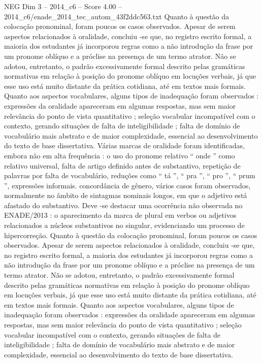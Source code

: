 \begin{textsample}{NEG Dim 3 – 2014\_c6 – Score 4.00 – 2014\_c6/enade\_2014\_tec\_autom\_43f2ddc563.txt}
Quanto à questão da colocação pronominal, foram poucos os casos observados.
Apesar de serem aspectos relacionados à oralidade, concluiu -se que, no registro escrito formal, a maioria dos estudantes já incorporou regras como a não introdução da frase por um pronome oblíquo e a próclise na presença de um termo atrator.
Não se adotou, entretanto, o padrão excessivamente formal descrito pelas gramáticas normativas em relação à posição do pronome oblíquo em locuções verbais, já que esse uso está muito distante da prática cotidiana, até em textos mais formais.
Quanto aos aspectos vocabulares, alguns tipos de inadequação foram observados : expressões da oralidade apareceram em algumas respostas, mas sem maior relevância do ponto de vista quantitativo ; seleção vocabular incompatível com o contexto, gerando situações de falta de inteligibilidade ; falta de domínio de vocabulário mais abstrato e de maior complexidade, essencial ao desenvolvimento do texto de base dissertativa.
Várias marcas de oralidade foram identificadas, embora não em alta frequência : o uso do pronome relativo “ onde ” como relativo universal, falta de artigo definido antes de substantivo, repetição de palavras por falta de vocabulário, reduções como “ tá ”, “ pra ”, “ pro ”, “ prum ”, expressões informais. concordância de gênero, vários casos foram observados, normalmente no âmbito de sintagmas nominais longos, em que o adjetivo está afastado do substantivo.
Deve -se destacar uma ocorrência não observada no ENADE/2013 : o aparecimento da marca de plural em verbos ou adjetivos relacionados a núcleos substantivos no singular, evidenciando um processo de hipercorreção.
Quanto à questão da colocação pronominal, foram poucos os casos observados.
Apesar de serem aspectos relacionados à oralidade, concluiu -se que, no registro escrito formal, a maioria dos estudantes já incorporou regras como a não introdução da frase por um pronome oblíquo e a próclise na presença de um termo atrator.
Não se adotou, entretanto, o padrão excessivamente formal descrito pelas gramáticas normativas em relação à posição do pronome oblíquo em locuções verbais, já que esse uso está muito distante da prática cotidiana, até em textos mais formais.
Quanto aos aspectos vocabulares, alguns tipos de inadequação foram observados : expressões da oralidade apareceram em algumas respostas, mas sem maior relevância do ponto de vista quantitativo ; seleção vocabular incompatível com o contexto, gerando situações de falta de inteligibilidade ; falta de domínio de vocabulário mais abstrato e de maior complexidade, essencial ao desenvolvimento do texto de base dissertativa.

\end{textsample}
